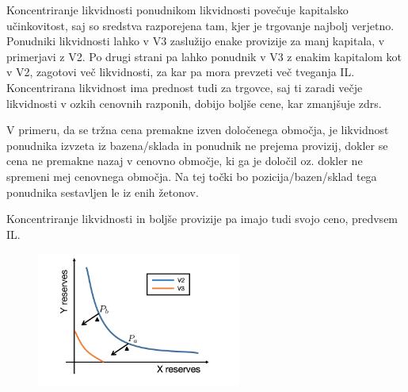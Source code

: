 \documentclass[a4paper,12pt]{article}%
\begin{document}
Koncentriranje likvidnosti ponudnikom likvidnosti povečuje kapitalsko učinkovitost, saj so sredstva razporejena tam, kjer je trgovanje najbolj verjetno. Ponudniki likvidnosti lahko v V3 zaslužijo enake provizije za manj kapitala, v primerjavi z V2. 
Po drugi strani pa lahko ponudnik v V3 z enakim kapitalom kot v V2, zagotovi več likvidnosti, za kar pa mora prevzeti več tveganja IL. 
Koncentrirana likvidnost ima prednost tudi za trgovce, saj ti zaradi večje likvidnosti v ozkih cenovnih razponih, dobijo boljše cene, kar zmanjšuje zdrs.  


V primeru, da se tržna cena premakne izven določenega območja, je likvidnost ponudnika izvzeta iz bazena/sklada in ponudnik ne prejema provizij, dokler se cena ne premakne nazaj v cenovno območje, ki ga je določil oz. dokler ne spremeni mej cenovnega območja. Na tej točki bo pozicija/bazen/sklad tega ponudnika sestavljen le iz enih žetonov. 

Koncentriranje likvidnosti in boljše provizije pa imajo tudi svojo ceno, predvsem IL. 




\begin{figure}[!ht]
    \centering
    \includegraphics[width=0.6\textwidth]{krivulja.png}
\end{figure}
\end{document}
